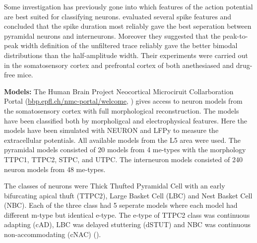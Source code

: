 \documentclass[altfont, fleqn]{uiophd}
\begin{document}
Some investigation has previously gone into which features of 
the action potential 
are best suited
for classifying neurons. 
\Textcite{bartho_characterization_2004}
evaluated several spike features and 
concluded that
the spike duration most reliably gave the best seperation between pyramidal neurons and
interneurons. 
Moreover they suggested that the peak-to-peak width definition
of the unfiltered trace reliably gave the better bimodal distributions
than the half-amplitude width. 
Their experiments were carried out in
the somatosensory cortex and prefrontal cortex of both anethesiased
and drug-free mice.
\newline

\noindent
\textbf{Models:}
The Human Brain Project Neocortical
Microciruit Collarboration Portal
(\url{bbp.epfl.ch/nmc-portal/welcome},
\textcite{ramaswamy_neocortical_2015})
gives access to neuron models from the somatosensory cortex 
with full morphological reconstruction. 
The models have been classified both by morpholigcal and electrophysical
features. 
Here the models have been simulated with NEURON and LFPy 
to measure the extracellular potentials. 
All available models from the L5 area were used.
The pyramidal models consisted of 20 models
from 4 me-types with the morphology
TTPC1, TTPC2, STPC, and UTPC. 
The interneuron models consisted of 240 neuron models
from 48 me-types.


The classes of neurons were Thick Thufted Pyramidal Cell with
an early bifurcating apical thuft (TTPC2), Large Basket Cell (LBC) and
Nest Basket Cell (NBC).
Each of the three class had 5 seperate models where each model
had different m-type but identical e-type.
The e-type of TTPC2 class was continuous adapting (cAD), 
LBC was delayed stuttering (dSTUT) 
and NBC was continuous non-accommodating (cNAC) 
(\textcite[463]{markram_reconstruction_2015}).
\newline
\end{document}
